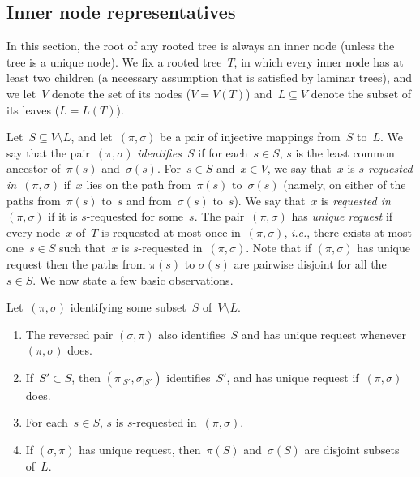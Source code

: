 \documentclass{lmcs} %
\def\ie{{\em i.e.}}
\begin{document}
\subsection{Inner node representatives}
\label{ssec:repr}
In this section, the root of any rooted tree is always an inner node (unless the tree is a unique node).
We fix a rooted tree~$T$,\xspace%
in which every inner node has at least two children (a necessary assumption that is satisfied by laminar trees),
and we let~$V$ denote the set of its nodes ($V=V(T)$)
and~$L\subseteq V$ denote the subset of its leaves ($L=L(T)$).
\smallbreak

Let~$S\subseteq V\setminus L$,
and let~$(\pi,\sigma)$ be a pair of injective mappings from~$S$ to~$L$.
We say that the pair~$(\pi,\sigma)$ \emph{identifies~$S$}
if for each~$s\in S$, $s$ is the least common ancestor of~$\pi(s)$ and~$\sigma(s)$.
For~$s\in S$ and~$x\in V$,
we say that~$x$ is \emph{$s$-requested in~$(\pi,\sigma)$}
if~$x$ lies on the path from~$\pi(s)$ to~$\sigma(s)$
(namely, on either of the paths from~$\pi(s)$ to~$s$ and from~$\sigma(s)$ to~$s$).
We say that~$x$ is \emph{requested in~$(\pi,\sigma)$} if it is $s$-requested for some~$s$.
The pair~$(\pi,\sigma)$ has \emph{unique request}
if every node~$x$ of~$T$ is requested at most once in~$(\pi,\sigma)$,
\ie, there exists at most one~$s\in S$ such that~$x$ is $s$-requested in~$(\pi,\sigma)$. Note that if $(\pi,\sigma)$ has unique request then the paths from $\pi(s)$ to $\sigma(s)$ are pairwise disjoint for all the $s\in S$.
We now state a few basic observations.
\begin{rem}
    \label{rk:identification basic observations}
    Let~$(\pi,\sigma)$ identifying some subset~$S$ of~$V\setminus L$.
    \begin{enumerate}
        \item\label{rk:identification basic observations:commute}
            The reversed pair $(\sigma,\pi)$ also identifies~$S$
            and has unique request whenever~$(\pi,\sigma)$ does.
        \item\label{rk:identification basic observations:sub}
            If~$S'\subset S$, then $(\pi_{|S'},\sigma_{|S'})$ identifies~$S'$,
            and has unique request if~$(\pi, \sigma)$ does.
        \item\label{rk:identification basic observations:self-request}
            For each~$s\in S$, $s$ is $s$-requested in~$(\pi,\sigma)$.
        \item\label{rk:identification basic observations:disjoint}
            If $(\sigma,\pi)$ has unique request,
            then~$\pi(S)$ and~$\sigma(S)$ are disjoint subsets of~$L$.
    \end{enumerate}
\end{rem}
\end{document}
